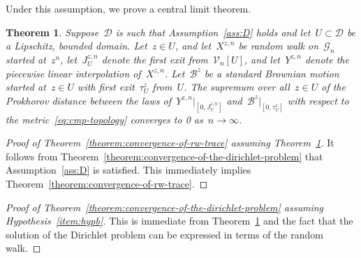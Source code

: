 \documentclass[12pt]{amsart}
\numberwithin{equation}{section}
\newtheorem{theorem}{Theorem}[section]
\newtheorem{lemma}[theorem]{Lemma}
\newcommand{\G}{\mathcal{G}}
\newcommand{\V}{\mathcal{V}}
\newcommand{\eps}{\varepsilon}
\begin{document}





Under this assumption, we prove a central limit theorem.

\begin{theorem}
	\label{theorem:general-clt}
	Suppose~$\mathcal{D}$ is such that Assumption~\ref{ass:D} holds and let~$U \subset \mathcal{D}$ be a {Lipschitz}, bounded domain. Let~$z \in U$, and let~$X^{z, n}$ be random walk on~$\G_n$ 
	started at~$z^{n}$, let~$J^{z, n}_U$ denote the first exit from~$\V_n[U]$,
	and let~$Y^{z, n}$ denote the piecewise linear interpolation of~$X^{z, n}$.
	Let~$\mathcal{B}^z$ be a standard Brownian motion started at~$z \in U$ with first exit~$\tau^{z}_U$ from~$U$. 
	The supremum over all~$z \in U$ of the Prokhorov distance between the laws of~$Y^{z, n} \vert_{[0,J^{z, n}_U]}$ and~$\mathcal{B}^{z} \vert_{[0, \tau^{z}_U]}$ with respect to the metric~\eqref{eq:cmp-topology} converges to 0 as~$n \to \infty$. 
\end{theorem}

\begin{proof}[Proof of Theorem~\ref{theorem:convergence-of-rw-trace} assuming Theorem~\ref{theorem:general-clt}]
	It follows from Theorem~\ref{theorem:convergence-of-the-dirichlet-problem} that Assumption~\ref{ass:D}
	is satisfied. This immediately implies Theorem~\ref{theorem:convergence-of-rw-trace}.
\end{proof}

\begin{proof}[Proof of Theorem~\ref{theorem:convergence-of-the-dirichlet-problem} assuming Hypothesis~\ref{item:hypb}]
This is immediate from Theorem~\ref{theorem:general-clt} and the fact that the solution of the Dirichlet problem can be expressed in terms of the random walk. 
\end{proof}
\end{document}
